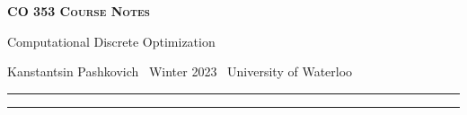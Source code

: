 \documentclass[10pt]{article}
\numberwithin{equation}{section}
\newcommand{\newtitle}[4]{
  \begin{center}
	\huge{\textbf{\textsc{#1 Course Notes}}}
    
	\large{\sc #2}
    
	{\sc #3 \textbullet\, #4 \textbullet\, University of Waterloo}
	\normalsize\vspace{1cm}\hrule
  \end{center}
}
\begin{document}
\pagestyle{fancy}
\newtitle{CO 353}{Computational Discrete Optimization}{Kanstantsin Pashkovich}{Winter 2023}

\tableofcontents
\vspace{1cm}\hrule
\fancyhead[R]{\nouppercase\rightmark}
\newpage 
{}

\newpage
\newpage
\end{document}
